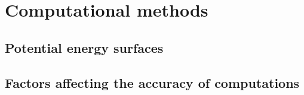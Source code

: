 \chapter{Computational methods}%
\label{ch:computational_methods}

\lipsum[1]

\section{Potential energy surfaces}

\lipsum[2]

\section{Factors affecting the accuracy of computations}

\lipsum[3]